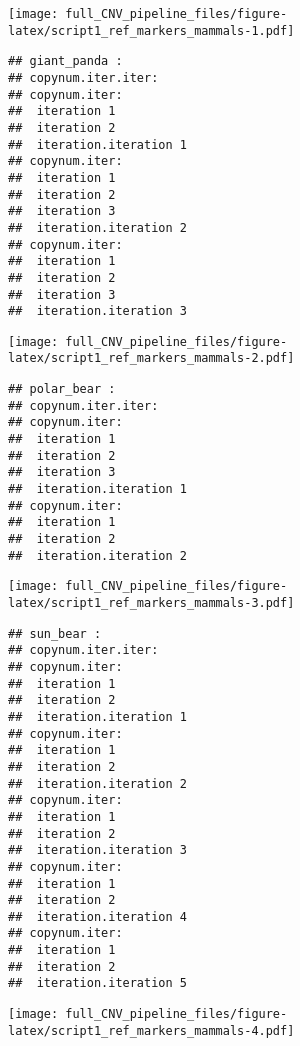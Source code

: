 \documentclass[]{article}
\begin{document}
\texttt{[image: full\_CNV\_pipeline\_files/figure-latex/script1\_ref\_markers\_mammals-1.pdf]}

\begin{verbatim}
## giant_panda :
## copynum.iter.iter:
## copynum.iter:
##  iteration 1 
##  iteration 2 
##  iteration.iteration 1 
## copynum.iter:
##  iteration 1 
##  iteration 2 
##  iteration 3 
##  iteration.iteration 2 
## copynum.iter:
##  iteration 1 
##  iteration 2 
##  iteration 3 
##  iteration.iteration 3
\end{verbatim}

\texttt{[image: full\_CNV\_pipeline\_files/figure-latex/script1\_ref\_markers\_mammals-2.pdf]}

\begin{verbatim}
## polar_bear :
## copynum.iter.iter:
## copynum.iter:
##  iteration 1 
##  iteration 2 
##  iteration 3 
##  iteration.iteration 1 
## copynum.iter:
##  iteration 1 
##  iteration 2 
##  iteration.iteration 2
\end{verbatim}

\texttt{[image: full\_CNV\_pipeline\_files/figure-latex/script1\_ref\_markers\_mammals-3.pdf]}

\begin{verbatim}
## sun_bear :
## copynum.iter.iter:
## copynum.iter:
##  iteration 1 
##  iteration 2 
##  iteration.iteration 1 
## copynum.iter:
##  iteration 1 
##  iteration 2 
##  iteration.iteration 2 
## copynum.iter:
##  iteration 1 
##  iteration 2 
##  iteration.iteration 3 
## copynum.iter:
##  iteration 1 
##  iteration 2 
##  iteration.iteration 4 
## copynum.iter:
##  iteration 1 
##  iteration 2 
##  iteration.iteration 5
\end{verbatim}

\texttt{[image: full\_CNV\_pipeline\_files/figure-latex/script1\_ref\_markers\_mammals-4.pdf]}
\end{document}
